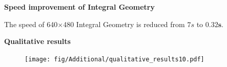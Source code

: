 \documentclass[a0paper,landscape,final]{baposter}
\begin{document}
\begin{poster}
{\vspace{-0.25cm}
{\bf Speed improvement of Integral Geometry}

 The speed of 640$\times$480 Integral Geometry is reduced from $7s$ to $\bm{0.32s}$.

\vspace{0.1cm}
{\bf Qualitative results}
\vspace{-0.25cm}
\begin{figure}[H]
    \centering
    \texttt{[image: fig/Additional/qualitative\_results10.pdf]}
\end{figure}
\vspace{-0.27cm}
%
%
%
%
%
%
%
%


}
\end{poster}
\end{document}
